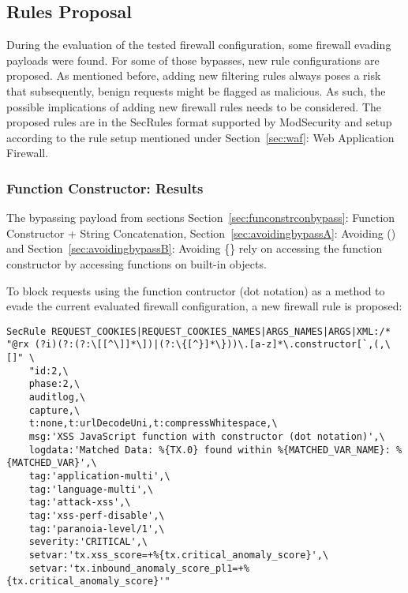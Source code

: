 \subsection{Rules Proposal}
\label{sec:rulesproposal}
During the evaluation of the tested firewall configuration, some firewall evading payloads were found. For some of those bypasses, new rule configurations are proposed. As mentioned before, adding new filtering rules always poses a risk that subsequently, benign requests might be flagged as malicious. As such, the possible implications of adding new firewall rules needs to be considered.
The proposed rules are in the SecRules format supported by ModSecurity and setup according to the rule setup mentioned under Section~\ref{sec:waf}: Web Application Firewall.

\subsubsection{Function Constructor: Results}
\label{sec:rulespropfunctionconstructor}
The bypassing payload from sections Section~\ref{sec:funconstrconbypass}: Function Constructor + String Concatenation, Section~\ref{sec:avoidingbypassA}: Avoiding () and Section~\ref{sec:avoidingbypassB}: Avoiding \{\} rely on accessing the function constructor by accessing functions on built-in objects.

To block requests using the function contructor (dot notation) as a method to evade the current evaluated firewall configuration, a new firewall rule is proposed:

\begin{lstlisting}[style=basicStyle, caption=rule proposal to block usage of function constructor via dot notation, label={lst:constructorsruleproposal}]
SecRule REQUEST_COOKIES|REQUEST_COOKIES_NAMES|ARGS_NAMES|ARGS|XML:/* "@rx (?i)(?:(?:\[[^\]]*\])|(?:\{[^}]*\}))\.[a-z]*\.constructor[`,(,\[]" \
    "id:2,\
    phase:2,\
    auditlog,\
    capture,\
    t:none,t:urlDecodeUni,t:compressWhitespace,\
    msg:'XSS JavaScript function with constructor (dot notation)',\
    logdata:'Matched Data: %{TX.0} found within %{MATCHED_VAR_NAME}: %{MATCHED_VAR}',\
    tag:'application-multi',\
    tag:'language-multi',\
    tag:'attack-xss',\
    tag:'xss-perf-disable',\
    tag:'paranoia-level/1',\
    severity:'CRITICAL',\
    setvar:'tx.xss_score=+%{tx.critical_anomaly_score}',\
    setvar:'tx.inbound_anomaly_score_pl1=+%{tx.critical_anomaly_score}'"
\end{lstlisting}

